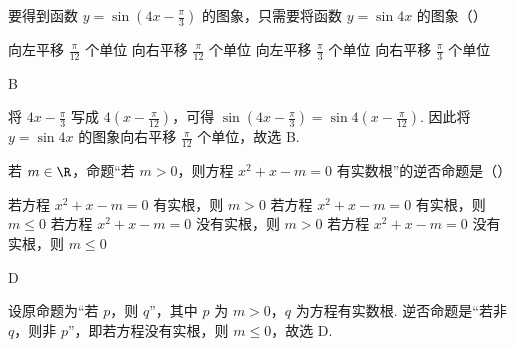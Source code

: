\begin{problem}
要得到函数 \( y = \sin \left(4x - \frac{\pi}{3}\right) \) 的图象，只需要将函数 \( y = \sin 4x \) 的图象（\quad）

\choices
    {向左平移 \(\frac{\pi}{12}\) 个单位}
    {向右平移 \(\frac{\pi}{12}\) 个单位}
    {向左平移 \(\frac{\pi}{3}\) 个单位}
    {向右平移 \(\frac{\pi}{3}\) 个单位}
\end{problem}

\begin{answer}
B
\end{answer}

\begin{solution}
将 \(4x-\frac{\pi}{3}\) 写成 \(4\left(x-\frac{\pi}{12}\right)\)，可得
\(\sin\left(4x-\frac{\pi}{3}\right)=\sin 4\left(x-\frac{\pi}{12}\right)\). 因此将 \(y=\sin4x\) 的图象向右平移 \(\frac{\pi}{12}\) 个单位，故选 B.
\end{solution}

\begin{problem}
若 \(m \in \R\)，命题“若 \(m > 0\)，则方程 \(x^{2} + x - m = 0\) 有实数根”的逆否命题是（\quad）

\choices
    {若方程 \(x^{2} + x - m = 0\) 有实根，则 \(m > 0\)}
    {若方程 \(x^{2} + x - m = 0\) 有实根，则 \(m \leqslant 0\)}
    {若方程 \(x^{2} + x - m = 0\) 没有实根，则 \(m > 0\)}
    {若方程 \(x^{2} + x - m = 0\) 没有实根，则 \(m \leqslant 0\)}
\end{problem}

\begin{answer}
D
\end{answer}

\begin{solution}
设原命题为“若 \(p\)，则 \(q\)”，其中 \(p\) 为 \(m>0\)，\(q\) 为方程有实数根. 逆否命题是“若非 \(q\)，则非 \(p\)”，即若方程没有实根，则 \(m\leqslant0\)，故选 D.
\end{solution}

